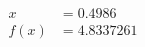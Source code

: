 \documentclass[preview]{standalone}
\begin{document}
\begin{align*}
x &= 0.4986\\f(x) &= 4.8337261
\end{align*}
\end{document}
